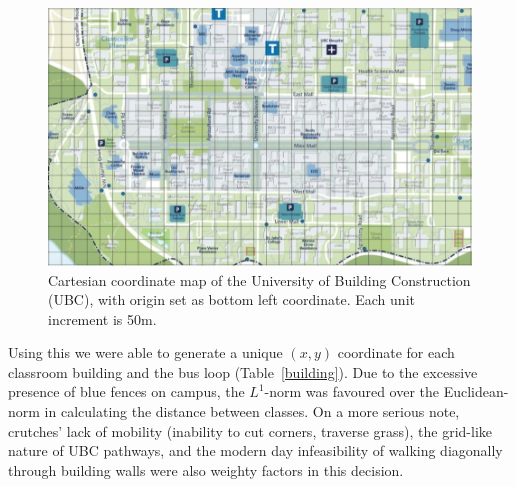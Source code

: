\documentclass[11pt, oneside]{article}   	%
\newcommand{\rowstyle}[1]{\gdef\currentrowstyle{#1} #1\ignorespaces}
\begin{document}
\begin{figure}[h]                                   
\begin{center}
\includegraphics[width=.9\textwidth]{grids.jpg}
\caption{Cartesian coordinate map of the University of Building Construction (UBC), with origin set as bottom left coordinate. Each unit increment is 50m.}
\label{grids}
\end{center}
\end{figure}

Using this we were able to generate a unique $(x,y)$ coordinate for each classroom building and the  bus loop (Table~\ref{building}). Due to the excessive presence of blue fences on campus, the $L^1$-norm was favoured over the Euclidean-norm in calculating the distance between classes. On a more serious note, crutches' lack of mobility (inability to cut corners, traverse grass), the grid-like nature of UBC pathways, and the modern day infeasibility of walking diagonally through building walls were also weighty factors in this decision.


\begin{table}[h]                                          %
\begin{center}
\end{center}
\caption{$(x,y)$ coordinate for buildings on UBC Vancouver campus.}
\label{building}
\end{table}
\end{document}
